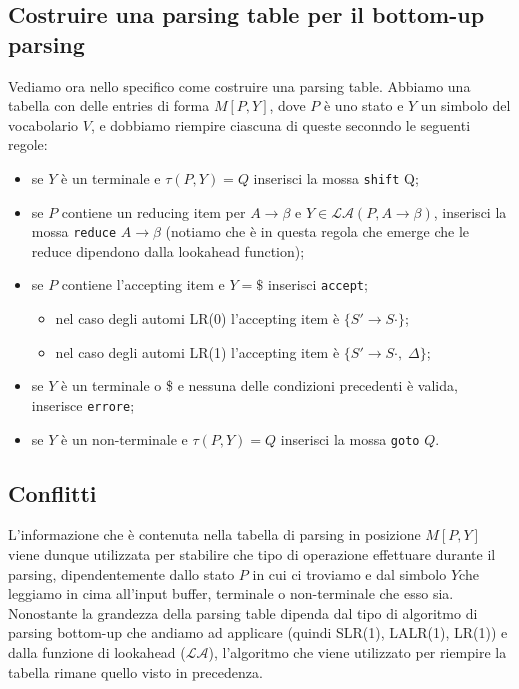 \documentclass[class=book, crop=false, oneside, 12pt]{standalone}
\begin{document}
\subsection{Costruire una parsing table per il bottom-up parsing}
Vediamo ora nello specifico come costruire una parsing table. Abbiamo una tabella con delle entries di forma \(M[P, Y]\), dove \(P\) è uno stato e \(Y\) un simbolo del vocabolario \(V\), e dobbiamo riempire ciascuna di queste seconndo le seguenti regole:
\begin{itemize}
    \item se \(Y\) è un terminale e \(\tau (P,Y) = Q\) inserisci la mossa \texttt{shift} Q;
    \item se \(P\) contiene un reducing item per \(A \to \beta\) e \(Y \in \mathcal{LA}(P, A \to \beta)\), inserisci la mossa \texttt{reduce} \(A \to \beta\) (notiamo che è in questa regola che emerge che le reduce dipendono dalla lookahead function);
    \item se \(P\) contiene l'accepting item e \(Y=\$\) inserisci \texttt{accept};
        \begin{itemize}
            \item nel caso degli automi LR(0) l'accepting item è \(\{S' \to S \cdot\}\);
            \item nel caso degli automi LR(1) l'accepting item è \(\{S' \to S \cdot, \; \Delta\}\);
        \end{itemize}
\item se \(Y\) è un terminale o \$ e nessuna delle condizioni precedenti è valida, inserisce \texttt{errore};
    \item se \(Y\) è un non-terminale e \(\tau (P, Y) = Q\) inserisci la mossa \texttt{goto} \(Q\).
\end{itemize}

\subsection{Conflitti}
L'informazione che è contenuta nella tabella di parsing in posizione \(M[P, Y]\) viene dunque utilizzata per stabilire che tipo di operazione effettuare durante il parsing, dipendentemente dallo stato \(P\) in cui ci troviamo e dal simbolo \(Y\)che leggiamo in cima all'input buffer, terminale o non-terminale che esso sia. Nonostante la grandezza della parsing table dipenda dal tipo di algoritmo di parsing bottom-up che andiamo ad applicare (quindi SLR(1), LALR(1), LR(1)) e dalla funzione di lookahead (\(\mathcal{LA}\)), l'algoritmo che viene utilizzato per riempire la tabella rimane quello visto in precedenza.
\end{document}
